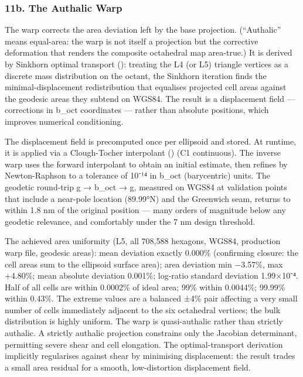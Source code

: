 \documentclass[
  11pt,
  a4paper,
]{article}
\begin{document}
\subsubsection{11b. The Authalic Warp}\label{b.-the-authalic-warp}

The warp corrects the area deviation left by the base projection.
(``Authalic'' means equal-area: the warp is not itself a projection but
the corrective deformation that renders the composite octahedral map
area-true.) It is derived by Sinkhorn optimal transport
(): treating the L4 (or
L5) triangle vertices as a discrete mass distribution on the octant, the
Sinkhorn iteration finds the minimal-displacement redistribution that
equalises projected cell areas against the geodesic areas they subtend
on WGS84. The result is a displacement field --- corrections in b\_oct
coordinates --- rather than absolute positions, which improves numerical
conditioning.

The displacement field is precomputed once per ellipsoid and stored. At
runtime, it is applied via a Clough-Tocher interpolant
() (C1
continuous). The inverse warp uses the forward interpolant to obtain an
initial estimate, then refines by Newton-Raphson to a tolerance of 10⁻¹⁴
in b\_oct (barycentric) units. The geodetic round-trip g → b\_oct → g,
measured on WGS84 at validation points that include a near-pole location
(89.99°N) and the Greenwich seam, returns to within 1.8 nm of the
original position --- many orders of magnitude below any geodetic
relevance, and comfortably under the 7 nm design threshold.

The achieved area uniformity (L5, all 708,588 hexagons, WGS84,
production warp file, geodesic areas): mean deviation exactly 0.000\%
(confirming closure: the cell areas sum to the ellipsoid surface area);
area deviation min −3.57\%, max +4.80\%; mean absolute deviation
0.001\%; log-ratio standard deviation 1.99×10⁻⁴. Half of all cells are
within 0.0002\% of ideal area; 99\% within 0.0044\%; 99.99\% within
0.43\%. The extreme values are a balanced ±4\% pair affecting a very
small number of cells immediately adjacent to the six octahedral
vertices; the bulk distribution is highly uniform. The warp is
quasi-authalic rather than strictly authalic. A strictly authalic
projection constrains only the Jacobian determinant, permitting severe
shear and cell elongation. The optimal-transport derivation implicitly
regularises against shear by minimising displacement: the result trades
a small area residual for a smooth, low-distortion displacement field.
\end{document}
